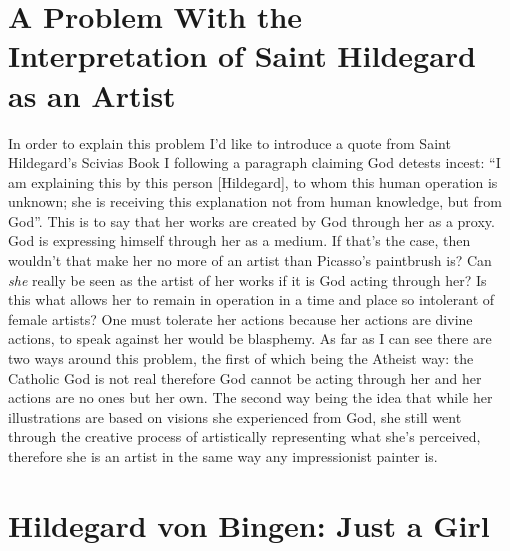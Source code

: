 \documentclass{turabian-researchpaper}
\begin{document}
\section{A Problem With the Interpretation of Saint Hildegard as an Artist}

    In order to explain this problem I'd like to introduce a quote from Saint Hildegard's Scivias Book I following a paragraph claiming God detests incest: ``I am explaining this by this person [Hildegard], to whom this human operation is unknown; she is receiving this explanation not from human knowledge, but from God''.\autocite{scivias}\autocite[82]{scivias} This is to say that her works are created by God through her as a proxy. God is expressing himself through her as a medium. If that's the case, then wouldn't that make her no more of an artist than Picasso's paintbrush is? Can \emph{she} really be seen as the artist of her works if it is God acting through her? Is this what allows her to remain in operation in a time and place so intolerant of female artists? One must tolerate her actions because her actions are divine actions, to speak against her would be blasphemy. As far as I can see there are two ways around this problem, the first of which being the Atheist way: the Catholic God is not real therefore God cannot be acting through her and her actions are no ones but her own. The second way being the idea that while her illustrations are based on visions she experienced from God, she still went through the creative process of artistically representing what she's perceived, therefore she is an artist in the same way any impressionist painter is.
    

\section{Hildegard von Bingen: Just a Girl}
\end{document}
